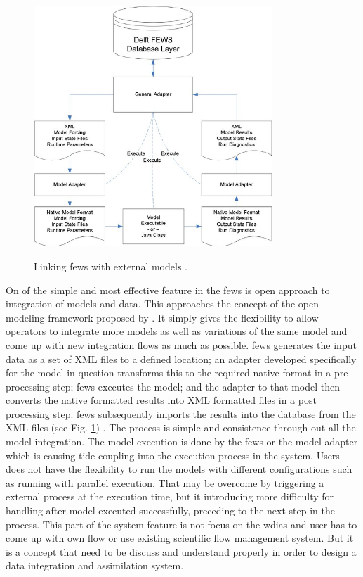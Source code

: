 \begin{figure}[htp]
    \centering
    \includegraphics[width=0.8\textwidth]{fews/Linking-Delft-FEWS-with-external-models-The-fi-gure-shows-the-fl-ow-of-data-through-XML_W640.jpg}\\
    \caption[Linking \acrshort{fews} with external models]{Linking \acrshort{fews} with external models \cite{Werner2013TheSystem}.}
    \label{fi:fews_general_adapter}
\end{figure}
On of the simple and most effective feature in the \acrshort{fews} is open approach to integration of models and data. This approaches the concept of the open modeling framework proposed by \cite{Kokkonen2003InterfacingXML}. It simply gives the flexibility to allow operators to integrate more models as well as variations of the same model and come up with new integration flows as much as possible.
\acrshort{fews} generates the input data as a set of XML files to a defined location; an adapter developed specifically for the model in question transforms this to the required native format in a pre-processing step; \acrshort{fews} executes the model; and the adapter to that model then converts the native formatted results into XML formatted files in a post processing step. \acrshort{fews} subsequently imports the results into the database from the XML files (see Fig. \ref{fi:fews_general_adapter}) \cite{Werner2013TheSystem}. The process is simple and consistence through out all the model integration. The model execution is done by the \acrshort{fews} or the model adapter which is causing tide coupling into the execution process in the system. Users does not have the flexibility to run the models with different configurations such as running with parallel execution. That may be overcome by triggering a external process at the execution time, but it introducing more difficulty for handling after model executed successfully, preceding to the next step in the process. This part of the system feature is not focus on the \acrshort{wdias} and user has to come up with own flow or use existing scientific flow management system. But it is a concept that need to be discuss and understand properly in order to design a data integration and assimilation system.

